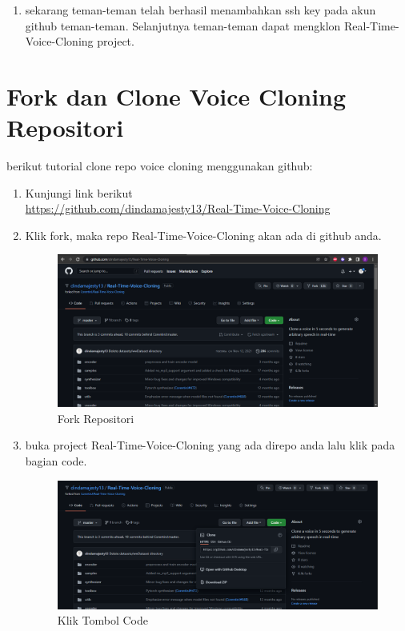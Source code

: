 \begin{enumerate}
\item sekarang teman-teman telah berhasil menambahkan ssh key pada akun github teman-teman. Selanjutnya teman-teman dapat mengklon Real-Time-Voice-Cloning project.

\end{enumerate}

\section{Fork dan Clone Voice Cloning Repositori}
berikut tutorial clone repo voice cloning menggunakan github:
\begin{enumerate}
\item Kunjungi link berikut \\ \small \url{https://github.com/dindamajesty13/Real-Time-Voice-Cloning}
\item Klik fork, maka repo Real-Time-Voice-Cloning akan ada di github anda.
\begin{figure}[H]
\centering
\includegraphics[scale=.3]{figures/repo}
\caption{Fork Repositori}
\label{repo1}
\end{figure}

\item buka project Real-Time-Voice-Cloning yang ada direpo anda lalu klik pada bagian code.
\begin{figure}[H]
\centering
\includegraphics[scale=.3]{figures/repo1}
\caption{Klik Tombol Code}
\label{repo2}
\end{figure}


\end{enumerate}
